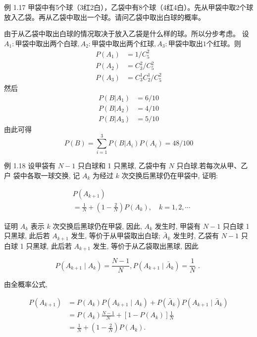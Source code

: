\documentclass{beamer}
\begin{document}
	\begin{frame}
		例 1.17 甲袋中有5个球（3红2白），乙袋中有8个球（4红4白）。先从甲袋中取2个球放入乙袋。再从乙袋中取出一个球。请问乙袋中取出白球的概率。
		
		由于从乙袋中取出白球的情况取决于放入乙袋是什么样的球。所以分步考虑。
		设$A_1: \text{甲袋中取出两个白球}, A_2: \text{甲袋中取出两个红球}, A_3: \text{甲袋中取出1个红球}$。则
		\begin{align}
			P(A_1) &= 1 / C_5^2 \\
			P(A_2) &= C_3^2 / C_5^2 \\
			P(A_3) &= C_3^1 C_2^1 / C_5^2
		\end{align}
		然后
		\begin{align}
			P(B | A_1) &= 6 / 10 \\
			P(B | A_2) &= 4 / 10 \\
			P(B | A_3) &= 5 / 10
		\end{align}
		由此可得
		\[
		P(B) = \sum_{i = 1}^{3}P(B | A_i)P(A_i) = 48 / 100 
		\]
	\end{frame}
	
	\begin{frame}
		例 1.18 设甲袋有 $N-1$ 只白球和 1 只黑球, 乙袋中有 $N$ 只白球.若每次从甲、乙户 袋中各取一球交换, 记 $A_{k}$ 为经过 $k$ 次交换后黑球仍在甲袋中, 证明:
		
		\begin{align*}
			&P\left(A_{k+1}\right)\\
			&=\frac{1}{N}+\left(1-\frac{2}{N}\right) P\left(A_{k}\right), \quad k=1,2, \cdots
		\end{align*}
	\end{frame}
	
	\begin{frame}
		证明 $A_{k}$ 表示 $k$ 次交换后黑球仍在甲袋, 因此, $A_{k}$ 发生时, 甲袋有 $N-1$ 只白球 1 只黑球, 此后若 $A_{k+1}$ 发生, 等价于从甲袋取出白球; $\bar{A}_{k}$ 发生时, 乙袋有 $N-1$ 只白球 1 只黑球, 此后若 $A_{k+1}$ 发生, 等价于从乙袋取出黑球, 因此
		
		$$
		P\left(A_{k+1} \mid A_{k}\right)=\frac{N-1}{N}, P\left(A_{k+1} \mid \bar{A}_{k}\right)=\frac{1}{N} \text { . }
		$$
		
		由全概率公式,
		
		$$
		\begin{aligned}
			P\left(A_{k+1}\right) & =P\left(A_{k}\right) P\left(A_{k+1} \mid A_{k}\right)+P\left(\bar{A}_{k}\right) P\left(A_{k+1} \mid \bar{A}_{k}\right) \\
			& =P\left(A_{k}\right) \frac{N-1}{N}+\left[1-P\left(A_{k}\right)\right] \frac{1}{N} \\
			& =\frac{1}{N}+\left(1-\frac{2}{N}\right) P\left(A_{k}\right) .
		\end{aligned}
		$$
	\end{frame}
		
\end{document}
